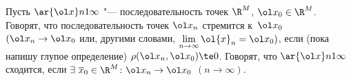 
	 Пусть $\ar {\ol x}n1\infty$ "--- последовательность точек $\R^M$, $\ol x_0\in\R^M$.
	 Говорят, что последовательность точек $\ol x_n$ стремится к~$\ol x_0$ $(\ol x_n \to \ol x_0$ или, другими словами,
	 $\lim\limits_{n \to \infty} \ol {x}_n = \ol x_0)$, если \textup{(}пока напишу глупое определение\textup{)} $\rho(\ol x_n, \ol x_0)\te0$.
	 Говорят, что $\ar {\ol x}n 1 \infty$ сходится, если $\exists\ \overline x_0\in \R^M\colon \ol x_n \to \ol x_0$ $(n \to \infty)$. 
	 